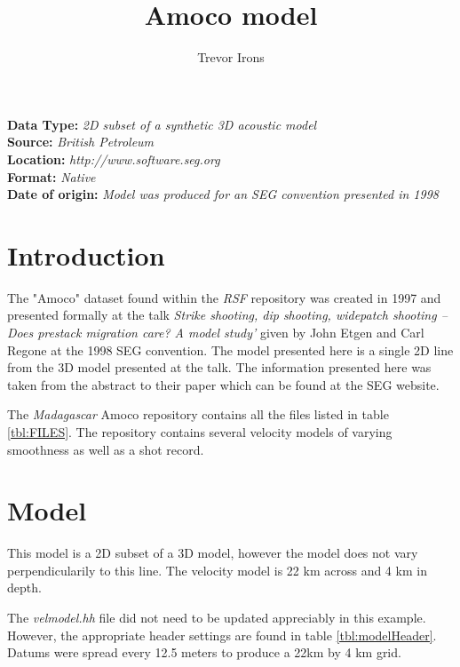 \title{Amoco model}
\author{Trevor Irons}
\maketitle
\lstset{language=python,numbers=left,numberstyle=\tiny,showstringspaces=false}

\noindent
\textbf {Data Type:} \emph{2D subset of a synthetic 3D acoustic model}\\
\textbf {Source:} \emph{British Petroleum}\\
\textbf {Location:} \emph{http://www.software.seg.org}\\
\textbf {Format:} \emph{Native} \\
\textbf{Date of origin:} \emph{Model was produced for an SEG convention presented in 1998}\\

\section{Introduction}
The "Amoco" dataset found within the \emph{RSF} repository was created in 1997 and presented formally at the talk \emph{Strike shooting, dip shooting, widepatch shooting -- Does prestack migration care? A model study'} given by John Etgen and Carl Regone at the 1998 SEG convention.  The model presented here is a single 2D line from the 3D model presented at the talk.  The information presented here was taken from the abstract to their paper which can be found at the SEG website.  

The \emph{Madagascar} Amoco repository contains all the files listed in table \ref{tbl:FILES}.  The repository contains several velocity models of varying smoothness as well as a shot record.   

{
\tiny

\normalsize
}

\section{Model}
This model is a 2D subset of a 3D model, however the model does not vary perpendicularily to this line.  The velocity model is 22 km across and 4 km in depth.

The \emph{velmodel.hh} file did not need to be updated appreciably in this example.  However, the appropriate header settings are found in table \ref{tbl:modelHeader}.  Datums were spread every 12.5 meters to produce a 22km by 4 km grid.  
 
